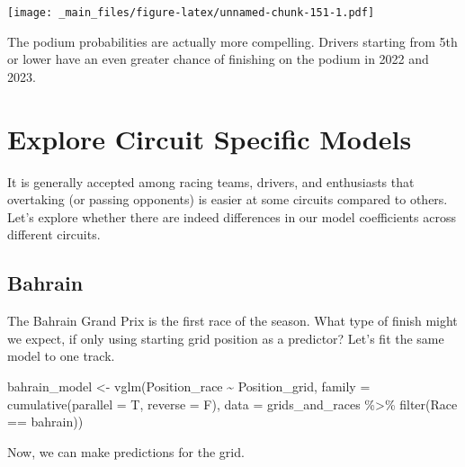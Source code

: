 \documentclass[
]{book}
\newenvironment{Shaded}{\begin{snugshade}}{\end{snugshade}}
\newcommand{\AttributeTok}[1]{\textcolor[rgb]{0.77,0.63,0.00}{#1}}
\newcommand{\FunctionTok}[1]{\textcolor[rgb]{0.00,0.00,0.00}{#1}}
\newcommand{\NormalTok}[1]{#1}
\newcommand{\OtherTok}[1]{\textcolor[rgb]{0.56,0.35,0.01}{#1}}
\newcommand{\SpecialCharTok}[1]{\textcolor[rgb]{0.00,0.00,0.00}{#1}}
\newcommand{\StringTok}[1]{\textcolor[rgb]{0.31,0.60,0.02}{#1}}
\begin{document}
\texttt{[image: \_main\_files/figure-latex/unnamed-chunk-151-1.pdf]}

The podium probabilities are actually more compelling. Drivers starting from 5th or lower have an even greater chance of finishing on the podium in 2022 and 2023.

\hypertarget{explore-circuit-specific-models}{%
\section{Explore Circuit Specific Models}\label{explore-circuit-specific-models}}

It is generally accepted among racing teams, drivers, and enthusiasts that overtaking (or passing opponents) is easier at some circuits compared to others. Let's explore whether there are indeed differences in our model coefficients across different circuits.

\hypertarget{bahrain}{%
\subsection{Bahrain}\label{bahrain}}

The Bahrain Grand Prix is the first race of the season. What type of finish might we expect, if only using starting grid position as a predictor? Let's fit the same model to one track.

\begin{Shaded}
\begin{Highlighting}[]
\NormalTok{bahrain\_model }\OtherTok{\textless{}{-}} \FunctionTok{vglm}\NormalTok{(Position\_race }\SpecialCharTok{\textasciitilde{}}\NormalTok{ Position\_grid, }
                      \AttributeTok{family =} \FunctionTok{cumulative}\NormalTok{(}\AttributeTok{parallel =}\NormalTok{ T, }\AttributeTok{reverse =}\NormalTok{ F),}
                      \AttributeTok{data =}\NormalTok{ grids\_and\_races }\SpecialCharTok{\%\textgreater{}\%}
                       \FunctionTok{filter}\NormalTok{(Race }\SpecialCharTok{==} \StringTok{\textquotesingle{}bahrain\textquotesingle{}}\NormalTok{))}
\end{Highlighting}
\end{Shaded}

Now, we can make predictions for the grid.
\end{document}
